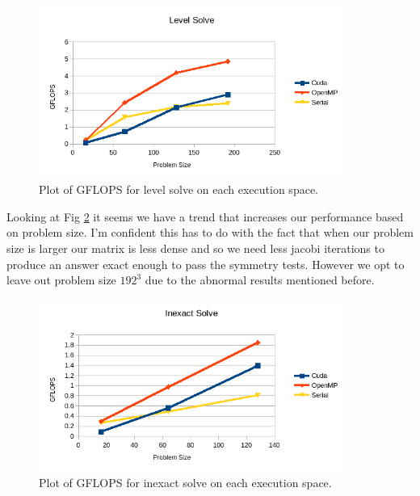 \documentclass{ccr15}
\begin{document}
\begin{figure}[H]
  \centering
  \includegraphics[width=10cm]{plots/ZAB-LevelSolve.png}
  \caption{Plot of GFLOPS for level solve on each execution space.}
  \label{Level}
\end{figure}

Looking at Fig \ref{Inexact} it seems we have a trend that increases our performance based on
problem size. I'm confident this has to do with the fact that when our problem size is larger our
matrix is less dense and so we need less jacobi iterations to produce an answer exact enough to
pass the symmetry tests. However we opt to leave out problem size $192^3$ due to the abnormal
results mentioned before.

\begin{figure}[H]
  \centering
  \includegraphics[width=10cm]{plots/ZAB-InexactSolve.png}
  \caption{Plot of GFLOPS for inexact solve on each execution space.}
  \label{Inexact}
\end{figure}
\end{document}
